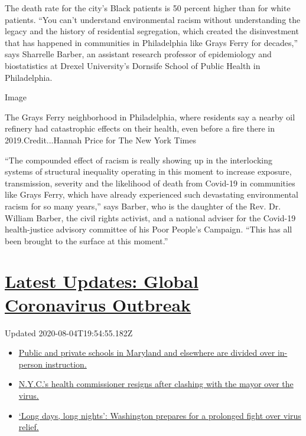 The death rate for the city's Black patients is 50 percent higher than
for white patients. ``You can't understand environmental racism without
understanding the legacy and the history of residential segregation,
which created the disinvestment that has happened in communities in
Philadelphia like Grays Ferry for decades,'' says Sharrelle Barber, an
assistant research professor of epidemiology and biostatistics at Drexel
University's Dornsife School of Public Health in Philadelphia.

Image

The Grays Ferry neighborhood in Philadelphia, where residents say a
nearby oil refinery had catastrophic effects on their health, even
before a fire there in 2019.Credit...Hannah Price for The New York Times

``The compounded effect of racism is really showing up in the
interlocking systems of structural inequality operating in this moment
to increase exposure, transmission, severity and the likelihood of death
from Covid-19 in communities like Grays Ferry, which have already
experienced such devastating environmental racism for so many years,''
says Barber, who is the daughter of the Rev. Dr. William Barber, the
civil rights activist, and a national adviser for the Covid-19
health-justice advisory committee of his Poor People's Campaign. ``This
has all been brought to the surface at this moment.''

\hypertarget{latest-updates-global-coronavirus-outbreak}{%
\section{\texorpdfstring{\href{https://www.nytimes.com/2020/08/04/world/coronavirus-cases.html?action=click\&pgtype=Article\&state=default\&region=MAIN_CONTENT_1\&context=storylines_live_updates}{Latest
Updates: Global Coronavirus
Outbreak}}{Latest Updates: Global Coronavirus Outbreak}}\label{latest-updates-global-coronavirus-outbreak}}

Updated 2020-08-04T19:54:55.182Z

\begin{itemize}
\tightlist
\item
  \href{https://www.nytimes.com/2020/08/04/world/coronavirus-cases.html?action=click\&pgtype=Article\&state=default\&region=MAIN_CONTENT_1\&context=storylines_live_updates\#link-4825b93}{Public
  and private schools in Maryland and elsewhere are divided over
  in-person instruction.}
\item
  \href{https://www.nytimes.com/2020/08/04/world/coronavirus-cases.html?action=click\&pgtype=Article\&state=default\&region=MAIN_CONTENT_1\&context=storylines_live_updates\#link-4d1eafa8}{N.Y.C.'s
  health commissioner resigns after clashing with the mayor over the
  virus.}
\item
  \href{https://www.nytimes.com/2020/08/04/world/coronavirus-cases.html?action=click\&pgtype=Article\&state=default\&region=MAIN_CONTENT_1\&context=storylines_live_updates\#link-6b644638}{`Long
  days, long nights': Washington prepares for a prolonged fight over
  virus relief.}
\end{itemize}

